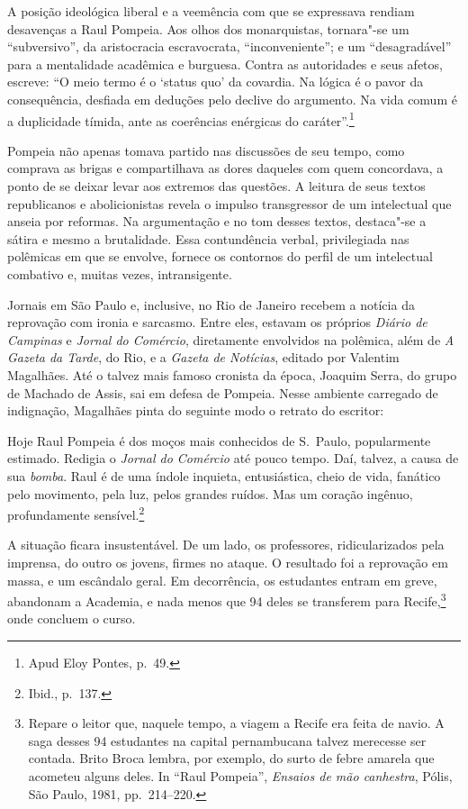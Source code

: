 A posição ideológica liberal e a veemência com que se
expressava rendiam desavenças a Raul Pompeia. Aos olhos dos
monarquistas, tornara"-se um ``subversivo'', da aristocracia
escravocrata, ``inconveniente''; e um ``desagradável'' para a mentalidade
acadêmica e burguesa. Contra as autoridades e seus afetos, escreve: ``O
meio termo é o `status quo' da covardia. Na lógica é o pavor da
consequência, desfiada em deduções pelo declive do argumento. Na vida
comum é a duplicidade tímida, ante as coerências enérgicas do
caráter''.\footnote{Apud Eloy Pontes, p.~49.}


Pompeia não apenas tomava partido nas discussões de seu tempo, como
comprava as brigas e compartilhava as dores daqueles com quem
concordava, a ponto de se deixar levar aos extremos das questões. A
leitura de seus textos republicanos e abolicionistas revela o impulso
transgressor de um intelectual que anseia por reformas. Na argumentação
e no tom desses textos, destaca"-se a sátira e mesmo a brutalidade.
Essa contundência verbal, privilegiada nas polêmicas em que se envolve,
fornece os contornos do perfil de um intelectual combativo e, muitas
vezes, intransigente.


Jornais em São Paulo e, inclusive, no Rio de Janeiro
recebem a notícia da reprovação com ironia e sarcasmo. Entre eles,
estavam os próprios \textit{Diário de Campinas} e \textit{Jornal do
Comércio}, diretamente envolvidos na polêmica, além de
\textit{A Gazeta da Tarde}, do Rio, e a
\textit{Gazeta de Notícias}, editado por
Valentim Magalhães. Até o talvez mais famoso cronista da época, Joaquim
Serra, do grupo de Machado de Assis, sai em defesa de Pompeia. Nesse
ambiente carregado de indignação, Magalhães pinta do seguinte modo o
retrato do escritor: 

\begin{hedraquote}
Hoje Raul Pompeia é dos moços mais conhecidos de S.~Paulo, 
popularmente estimado. Redigia o \textit{Jornal do
Comércio} até pouco tempo. Daí, talvez, a causa de sua
\textit{bomba}. Raul é de uma índole
inquieta, entusiástica, cheio de vida, fanático pelo movimento, pela
luz, pelos grandes ruídos. Mas um coração ingênuo, profundamente
sensível.\footnote{Ibid., p.~137.}
\end{hedraquote} 


A situação ficara insustentável. De um lado, os
professores, ridicularizados pela imprensa, do outro os jovens, firmes
no ataque. O resultado foi a reprovação em massa, e um escândalo geral.
Em decorrência, os estudantes entram em greve, abandonam a Academia, e
nada menos que 94 deles se transferem para Recife,\footnote{Repare o
leitor que, naquele tempo, a viagem a Recife era feita de navio. A saga
desses 94 estudantes na capital pernambucana talvez merecesse ser contada. Brito
Broca lembra, por exemplo, do surto de febre amarela que acometeu
alguns deles. In ``Raul Pompeia'', \textit{Ensaios de mão canhestra}, Pólis, 
São Paulo, 1981, pp.~214--220.} onde concluem o curso.


